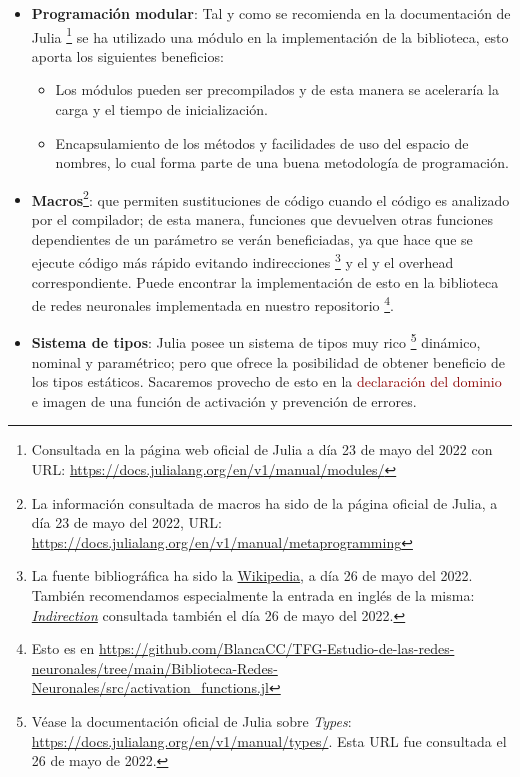 \begin{itemize}
    \item \textbf{Programación modular}: Tal y como se recomienda en la documentación de Julia \footnote{
        Consultada en la página web oficial de Julia  a día 23 de mayo del 2022 con URL: \url{https://docs.julialang.org/en/v1/manual/modules/}
    } se ha utilizado una módulo en la implementación de la biblioteca, esto aporta los siguientes beneficios: 
    \begin{itemize}
        \item Los módulos pueden ser precompilados y de esta manera se aceleraría la carga y el tiempo de inicialización. 
        \item Encapsulamiento de los métodos y facilidades de uso del espacio de nombres, lo cual forma parte
        de una buena metodología de programación. 
    \end{itemize}

    \item \textbf{Macros}\footnote{La información consultada de macros ha sido  de la página oficial de Julia, a día 23 de mayo del 2022, URL:
    \url{https://docs.julialang.org/en/v1/manual/metaprogramming}}:
    que permiten sustituciones de código cuando el código es analizado por el compilador; 
    de esta manera, funciones que devuelven otras funciones dependientes de un parámetro se verán beneficiadas,
    ya que hace que se ejecute código más rápido evitando indirecciones \footnote{La fuente bibliográfica ha sido la \href{https://es.wikipedia.org/wiki/Indirección}{Wikipedia}, a día 26 de mayo del 2022.
    También recomendamos especialmente la entrada en inglés de la misma:
    \href{https://en.wikipedia.org/wiki/Indirection}{\textit{Indirection}}
    consultada también el día 26 de mayo del 2022.
    }  y el y el overhead correspondiente. 
     Puede encontrar la implementación de esto en la biblioteca de redes neuronales implementada en nuestro 
     repositorio 
     \footnote{
         Esto es en \url{https://github.com/BlancaCC/TFG-Estudio-de-las-redes-neuronales/tree/main/Biblioteca-Redes-Neuronales/src/activation_functions.jl}
     }.

     
    \item \textbf{Sistema de tipos}: 
    Julia posee un sistema de tipos muy rico 
    \footnote{
        Véase la documentación oficial de Julia sobre \textit{Types}: 
        \url{https://docs.julialang.org/en/v1/manual/types/}. 
        Esta URL fue consultada el 26 de mayo de 2022.
    }
    dinámico, nominal y paramétrico; pero que ofrece la posibilidad de obtener
    beneficio de los tipos estáticos. Sacaremos provecho de esto en la \textcolor{darkRed}{declaración 
    del dominio} e imagen de una función de activación y prevención de errores. 


\end{itemize}
